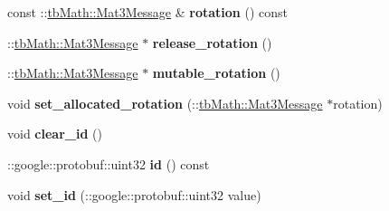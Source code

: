 \begin{DoxyCompactItemize}
const \+::\hyperlink{classtbMath_1_1Mat3Message}{tb\+Math\+::\+Mat3\+Message} \& {\bfseries rotation} () const
\item 
\mbox{\label{classtbBasics_1_1MoveActorBody_aa6b5672a99e8841b9264ea08286d233b}} 
\+::\hyperlink{classtbMath_1_1Mat3Message}{tb\+Math\+::\+Mat3\+Message} $\ast$ {\bfseries release\+\_\+rotation} ()
\item 
\mbox{\label{classtbBasics_1_1MoveActorBody_ae731ecc878206761872a86101ca3f31a}} 
\+::\hyperlink{classtbMath_1_1Mat3Message}{tb\+Math\+::\+Mat3\+Message} $\ast$ {\bfseries mutable\+\_\+rotation} ()
\item 
\mbox{\label{classtbBasics_1_1MoveActorBody_a1dec9dffe3e8e4a6b34f48541641b19b}} 
void {\bfseries set\+\_\+allocated\+\_\+rotation} (\+::\hyperlink{classtbMath_1_1Mat3Message}{tb\+Math\+::\+Mat3\+Message} $\ast$rotation)
\item 
\mbox{\label{classtbBasics_1_1MoveActorBody_a051f81f21a46cd5d6a830a0c18bf2ea3}} 
void {\bfseries clear\+\_\+id} ()
\item 
\mbox{\label{classtbBasics_1_1MoveActorBody_afd528f54c18c13b4513d96fd052b1da9}} 
\+::google\+::protobuf\+::uint32 {\bfseries id} () const
\item 
\mbox{\label{classtbBasics_1_1MoveActorBody_a971eee98a2e6217765c6fcf7bfa5aab5}} 
void {\bfseries set\+\_\+id} (\+::google\+::protobuf\+::uint32 value)
\end{DoxyCompactItemize}

